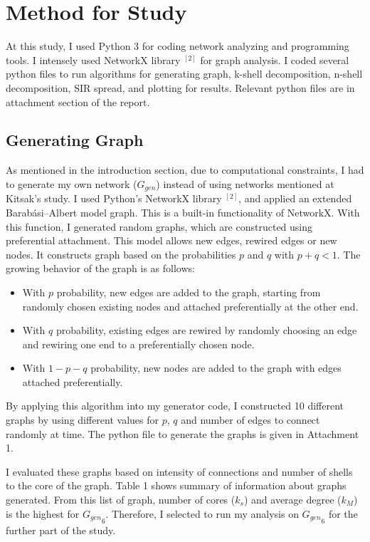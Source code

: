 \documentclass[11pt,a4,twocolumn]{article}
\begin{document}
\section{Method for Study} 

At this study, I used Python 3 for coding network analyzing and programming tools. I intensely used NetworkX library $^{[2]}$ for graph analysis. I coded several python files to run algorithms for generating graph, k-shell decomposition, n-shell decomposition, SIR spread, and plotting for results. Relevant  python files are in attachment section of the report.

\subsection{Generating Graph}

As mentioned in the introduction section, due to computational constraints, I had to generate my own network ($G_{gen}$) instead of using networks mentioned at Kitsak's study. I used Python's NetworkX library $^{[2]}$, and applied an extended Barabási–Albert model graph. This is a built-in functionality of NetworkX. With this function, I generated random graphs, which are constructed using preferential attachment. This model allows new edges, rewired edges or new nodes. It constructs graph based on the probabilities $p$ and $q$ with $p+q<1$. The growing behavior of the graph is as follows:

\begin{itemize}
  \item With $p$ probability, new edges are added to the graph, starting from randomly chosen existing nodes and attached preferentially at the other end. 
  \item With $q$ probability, existing edges are rewired by randomly choosing an edge and rewiring one end to a preferentially chosen node.
  \item With $1-p-q$ probability, new nodes are added to the graph with edges attached preferentially.
\end{itemize}

By applying this algorithm into my generator code, I constructed 10 different graphs by using different values for $p$, $q$ and number of edges to connect randomly at time. The python file to generate the graphs is given in Attachment 1. 

I evaluated these graphs based on intensity of connections and number of shells to the core of the graph.  Table 1 shows summary of information about graphs generated.  From this list of graph, number of cores ($k_{s}$) and average degree ($k_{M}$) is the highest for ${G_{gen}}_6$. Therefore, I selected to run my analysis on \textbf{${G_{gen}}_6$} for the further part of the study. 
\end{document}
